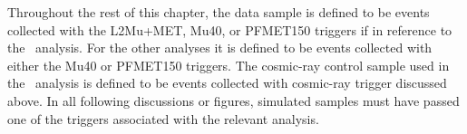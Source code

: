 Throughout the rest of this chapter, the data sample is defined to be events collected with the L2Mu+MET, Mu40, or PFMET150 triggers if in reference to the \muononly\ analysis.
For the other analyses it is defined to be events collected with either the Mu40 or PFMET150 triggers. The cosmic-ray control sample used in the \muononly\ analysis
is defined to be events collected with cosmic-ray trigger discussed above. In all following discussions or figures, simulated samples must have passed one of the triggers
associated with the relevant analysis.